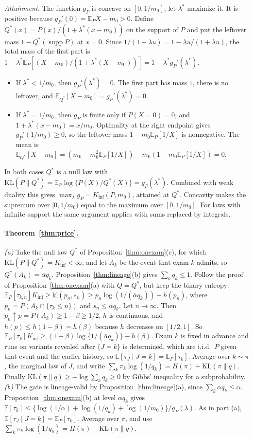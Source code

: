 \emph{Attainment.} The function $g_P$ is concave on $[0,1/m_0]$; let $\lambda^*$ maximize it. It is positive because $g_P'(0)=\mathbb E_PX-m_0>0$. Define $Q^*(x)=P(x)/(1+\lambda^*(x-m_0))$ on the support of $P$ and put the leftover mass $1-Q^*(\operatorname{supp}P)$ at $x=0$. Since $1/(1+\lambda u)=1-\lambda u/(1+\lambda u)$, the total mass of the first part is $1-\lambda^*\mathbb E_P[(X-m_0)/(1+\lambda^*(X-m_0))]=1-\lambda^*g_P'(\lambda^*)$.
\begin{itemize}
\item If $\lambda^*<1/m_0$, then $g_P'(\lambda^*)=0$. The first part has mass $1$, there is no leftover, and $\mathbb E_{Q^*}[X-m_0]=g_P'(\lambda^*)=0$.
\item If $\lambda^*=1/m_0$, then $g_P$ is finite only if $P(X=0)=0$, and $1+\lambda^*(x-m_0)=x/m_0$. Optimality at the right endpoint gives $g_P'(1/m_0)\ge0$, so the leftover mass $1-m_0\mathbb E_P[1/X]$ is nonnegative. The mean is $\mathbb E_{Q^*}[X-m_0]=(m_0-m_0^2\mathbb E_P[1/X])-m_0(1-m_0\mathbb E_P[1/X])=0$.
\end{itemize}
In both cases $Q^*$ is a null law with $\mathrm{KL}(P\|Q^*)=\mathbb E_P\log\{P(X)/Q^*(X)\}=g_P(\lambda^*)$. Combined with weak duality this gives $\max_\lambda g_P=K_{\inf}(P,m_0)$, attained at $Q^*$. Concavity makes the supremum over $[0,1/m_0)$ equal to the maximum over $[0,1/m_0]$. For laws with infinite support the same argument applies with sums replaced by integrals.

\paragraph{Theorem~\ref{thm:price}.}
\emph{(a)} Take the null law $Q^*$ of Proposition~\ref{thm:onexam}(c), for which $\mathrm{KL}(P\|Q^*)=K_{\inf}<\infty$, and let $A_k$ be the event that exam $k$ admits, so $Q^*(A_k)=\bar\alpha q_k$. Proposition~\ref{thm:lineage}(b) gives $\sum_kq_k\le1$. Follow the proof of Proposition~\ref{thm:onexam}(a) with $Q=Q^*$, but keep the binary entropy: $\mathbb E_P[\tau_{k,n}]K_{\inf}\ge\mathrm{kl}(p_n,s_n)\ge p_n\log(1/(\bar\alpha q_k))-h(p_n)$, where $p_n=P(A_k\cap\{\tau_k\le n\})$ and $s_n\le\bar\alpha q_k$. Let $n\to\infty$. Then $p_n\uparrow p=P(A_k)\ge1-\beta\ge1/2$, $h$ is continuous, and $h(p)\le h(1-\beta)=h(\beta)$ because $h$ decreases on $[1/2,1]$. So $\mathbb E_P[\tau_k]K_{\inf}\ge(1-\beta)\log\{1/(\bar\alpha q_k)\}-h(\beta)$. Exam $k$ is fixed in advance and runs on variants revealed after $\{J=k\}$ is determined, which are i.i.d.\ $P$ given that event and the earlier history, so $\mathbb E[\tau_J\mid J=k]=\mathbb E_P[\tau_k]$. Average over $k\sim\pi$, the marginal law of $J$, and write $\sum_k\pi_k\log(1/q_k)=H(\pi)+\mathrm{KL}(\pi\|q)$. Finally $\mathrm{KL}(\pi\|q)\ge-\log\sum_kq_k\ge0$ by Gibbs' inequality for a subprobability.
\emph{(b)} The gate is lineage-valid by Proposition~\ref{thm:lineage}(a), since $\sum_k\alpha q_k\le\alpha$. Proposition~\ref{thm:onexam}(b) at level $\alpha q_k$ gives $\mathbb E[\tau_k]\le\{\log(1/\alpha)+\log(1/q_k)+\log(1/m_0)\}/g_P(\lambda)$. As in part (a), $\mathbb E[\tau_J\mid J=k]=\mathbb E_P[\tau_k]$. Average over $\pi$, and use $\sum_k\pi_k\log(1/q_k)=H(\pi)+\mathrm{KL}(\pi\|q)$.

